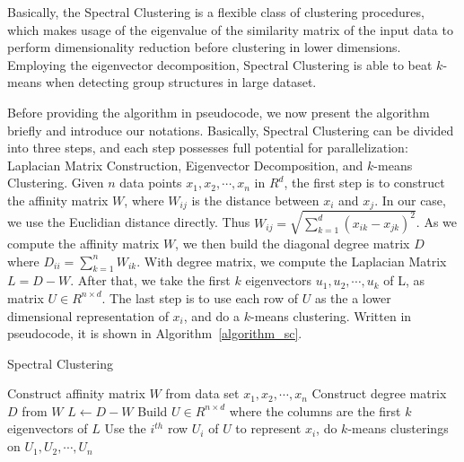\documentclass{acm_proc_article-sp}
\begin{document}
Basically, the Spectral Clustering is a flexible class of clustering procedures, which makes usage of the eigenvalue of the similarity matrix of the input data to perform dimensionality reduction before clustering in lower dimensions. Employing the eigenvector decomposition, Spectral Clustering is able to beat $k$-means when detecting group structures in large dataset.

Before providing the algorithm in pseudocode, we now present the algorithm briefly and introduce our notations. Basically, Spectral Clustering can be divided into three steps, and each step possesses full potential for parallelization: Laplacian Matrix Construction, Eigenvector Decomposition, and $k$-means Clustering. Given $n$ data points $x_1, x_2, \cdots, x_n$ in $R^d$, the first step is to construct the affinity matrix $W$, where $W_{ij}$ is the distance between $x_i$ and $x_j$. In our case, we use the Euclidian distance directly. Thus $W_{ij} = \sqrt{\sum_{k=1}^d(x_{ik} - x_{jk})^2}$. As we compute the affinity matrix $W$, we then build the diagonal degree matrix $D$ where $D_{ii} = \sum_{k=1}^nW_{ik}$. With degree matrix, we compute the Laplacian Matrix $L = D - W$. After that, we take the first $k$ eigenvectors $u_1, u_2, \cdots, u_k$ of L, as matrix $U \in R^{n\times d}$. The last step is to use each row of $U$ as the a lower dimensional representation of $x_i$, and do a $k$-means clustering. 
Written in pseudocode, it is shown in Algorithm~\ref{algorithm_sc}.
\begin{algorithm}
\caption{Spectral Clustering}
\label{CHalgorithm}
\begin{algorithmic}[1]
\State Construct affinity matrix $W$ from data set $x_1, x_2, \cdots, x_n$
\State Construct degree matrix $D$ from $W$
\State $L \leftarrow D - W$
\State Build $U \in R^{n \times d}$ where the columns are the first $k$ eigenvectors of $L$ 
\State Use the $i^{th}$ row $U_i$ of $U$ to represent $x_i$, do $k$-means clusterings on $U_1, U_2, \cdots, U_n$
\end{algorithmic}
\label{algorithm_sc}
\end{algorithm}
\end{document}
